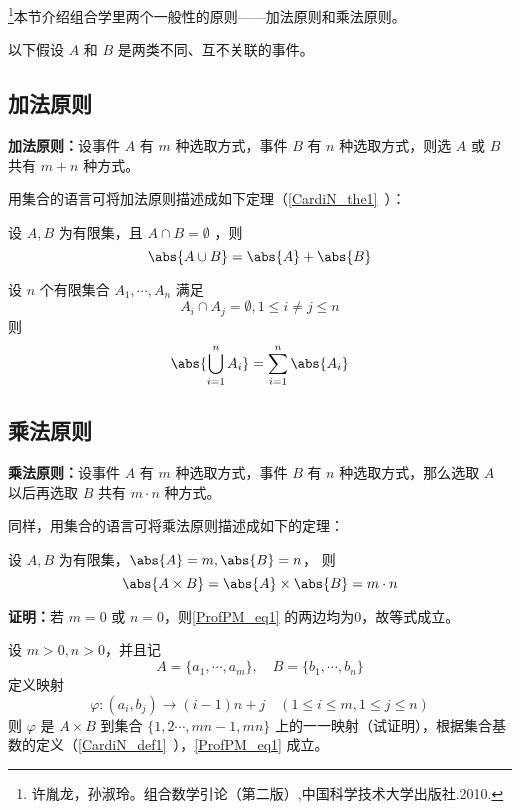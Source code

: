 
\footnote{许胤龙，孙淑玲。组合数学引论（第二版）,中国科学技术大学出版社.2010.}本节介绍组合学里两个一般性的原则——加法原则和乘法原则。

以下假设 $A$ 和 $B$ 是两类不同、互不关联的事件。
\subsection{加法原则}
\textbf{加法原则：}设事件 $A$ 有 $m$ 种选取方式，事件 $B$ 有 $n$ 种选取方式，则选 $A$ 或 $B$ 共有 $m+n$ 种方式。

用集合的语言可将加法原则描述成如下定理（\autoref{CardiN_the1}~）：
\begin{theorem}{}
设 $A,B$ 为有限集，且 $A\cap B=\emptyset$ ，则
\begin{equation}
\abs{A\cup B}=\abs{A}+\abs{B}
\end{equation}
\end{theorem}
\begin{corollary}{}
设 $n$ 个有限集合 $A_1,\cdots,A_n$ 满足
\begin{equation}
A_i\cap A_j=\emptyset,1\leq i\neq j\leq n
\end{equation}
则
\begin{equation}
\abs{\bigcup_{i=1}^n A_i}=\sum_{i=1}^n\abs{A_i}
\end{equation}

\end{corollary}
\subsection{乘法原则}\label{ProfPM_sub1}
\textbf{乘法原则：}设事件 $A$ 有 $m$ 种选取方式，事件 $B$ 有 $n$ 种选取方式，那么选取 $A$ 以后再选取 $B$ 共有 $m\cdot n$ 种方式。

同样，用集合的语言可将乘法原则描述成如下的定理：
\begin{theorem}{}\label{ProfPM_the1}
设 $A,B$ 为有限集，$\abs{A}=m,\abs{B}=n$， 则
\begin{equation}\label{ProfPM_eq1}
\abs{A\times B}=\abs{A}\times\abs{B}=m\cdot n
\end{equation}
\end{theorem}
\textbf{证明：}若 $m=0$ 或 $n=0$，则\autoref{ProfPM_eq1} 的两边均为0，故等式成立。

设 $m>0,n>0$，并且记
\begin{equation}
A=\{a_1,\cdots,a_m\},\quad B=\{b_1,\cdots,b_n\}
\end{equation}
定义映射
\begin{equation}
\varphi:(a_i,b_j)\rightarrow (i-1)n+j\quad (1\leq i\leq m,1\leq j\leq n)
\end{equation}
则 $\varphi$ 是 $A\times B$ 到集合 $\{1,2\cdots,mn-1,mn\}$ 上的一一映射（试证明），根据集合基数的定义（\autoref{CardiN_def1}~），\autoref{ProfPM_eq1} 成立。

